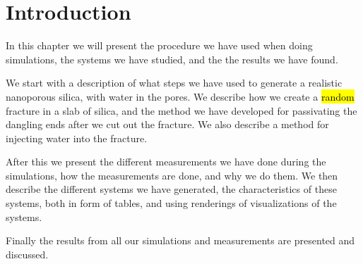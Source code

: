 \chapter{Introduction}
In this chapter we will present the procedure we have used when doing simulations, the systems we have studied, and the the results we have found. 

We start with a description of what steps we have used to generate a realistic nanoporous silica, with water in the pores. We describe how we create a \hl{random} fracture in a slab of silica, and the method we have developed for passivating the dangling ends after we cut out the fracture. We also describe a method for injecting water into the fracture.

After this we present the different measurements we have done during the simulations, how the measurements are done, and why we do them. We then describe the different systems we have generated, the characteristics of these systems, both in form of tables, and using renderings of visualizations of the systems.

Finally the results from all our simulations and measurements are presented and discussed. 